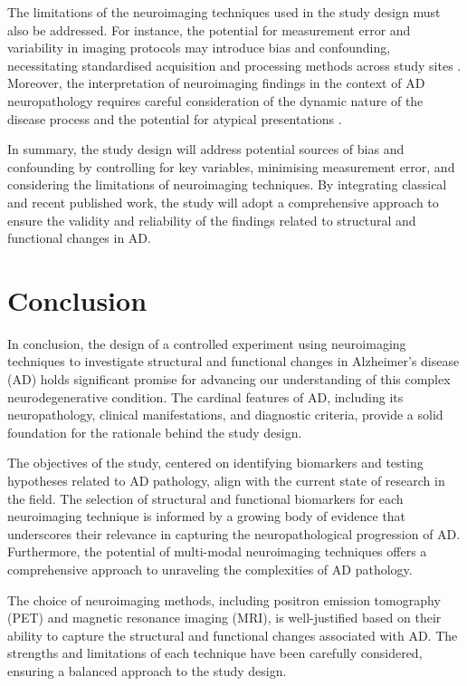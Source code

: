 \documentclass[10pt]{article}
\begin{document}
\begin{sloppypar}
  The limitations of the neuroimaging techniques used in the study design must also be addressed. For instance, the potential for measurement error and variability in imaging protocols may introduce bias and confounding, necessitating standardised acquisition and processing methods across study sites . Moreover, the interpretation of neuroimaging findings in the context of AD neuropathology requires careful consideration of the dynamic nature of the disease process and the potential for atypical presentations .

  In summary, the study design will address potential sources of bias and confounding by controlling for key variables, minimising measurement error, and considering the limitations of neuroimaging techniques. By integrating classical and recent published work, the study will adopt a comprehensive approach to ensure the validity and reliability of the findings related to structural and functional changes in AD.

  \section{Conclusion}
  \label{sec:conclusion}

  In conclusion, the design of a controlled experiment using neuroimaging techniques to investigate structural and functional changes in Alzheimer's disease (AD) holds significant promise for advancing our understanding of this complex neurodegenerative condition. The cardinal features of AD, including its neuropathology, clinical manifestations, and diagnostic criteria, provide a solid foundation for the rationale behind the study design.

  The objectives of the study, centered on identifying biomarkers and testing hypotheses related to AD pathology, align with the current state of research in the field. The selection of structural and functional biomarkers for each neuroimaging technique is informed by a growing body of evidence that underscores their relevance in capturing the neuropathological progression of AD. Furthermore, the potential of multi-modal neuroimaging techniques offers a comprehensive approach to unraveling the complexities of AD pathology.

  The choice of neuroimaging methods, including positron emission tomography (PET) and magnetic resonance imaging (MRI), is well-justified based on their ability to capture the structural and functional changes associated with AD. The strengths and limitations of each technique have been carefully considered, ensuring a balanced approach to the study design.


\end{sloppypar}
\end{document}
